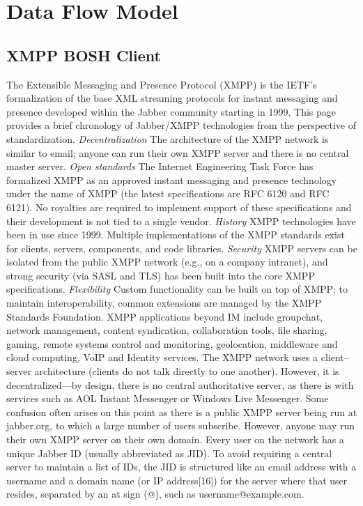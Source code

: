 \section{Data Flow Model}
\subsection{XMPP BOSH Client}
The Extensible Messaging and Presence Protocol (XMPP) is the IETF’s formalization of the base XML streaming protocols for instant messaging and presence developed within the Jabber community starting in 1999. This page provides a brief chronology of Jabber/XMPP technologies from the perspective of standardization\cite{xmpp}.
\newline
\emph{Decentralization}
\newline
The architecture of the XMPP network is similar to email; anyone can run their own XMPP server and there is no central master server.
\newline
\emph{Open standards}
\newline
The Internet Engineering Task Force has formalized XMPP as an approved instant messaging and presence technology under the name of XMPP (the latest specifications are RFC 6120 and RFC 6121). No royalties are required to implement support of these specifications and their development is not tied to a single vendor.
\newline
\emph{History}
\newline
XMPP technologies have been in use since 1999. Multiple implementations of the XMPP standards exist for clients, servers, components, and code libraries.
\newline
\emph{Security}
\newline
XMPP servers can be isolated from the public XMPP network (e.g., on a company intranet), and strong security (via SASL and TLS) has been built into the core XMPP specifications.
\newline
\emph{Flexibility}
\newline
Custom functionality can be built on top of XMPP; to maintain interoperability, common extensions are managed by the XMPP Standards Foundation. XMPP applications beyond IM include groupchat, network management, content syndication, collaboration tools, file sharing, gaming, remote systems control and monitoring, geolocation, middleware and cloud computing, VoIP and Identity services.
The XMPP network uses a client–server architecture (clients do not talk directly to one another). However, it is decentralized—by design, there is no central authoritative server, as there is with services such as AOL Instant Messenger or Windows Live Messenger. Some confusion often arises on this point as there is a public XMPP server being run at jabber.org, to which a large number of users subscribe. However, anyone may run their own XMPP server on their own domain.
Every user on the network has a unique Jabber ID (usually abbreviated as JID). To avoid requiring a central server to maintain a list of IDs, the JID is structured like an email address with a username and a domain name (or IP address[16]) for the server where that user resides, separated by an at sign (@), such as username@example.com.

